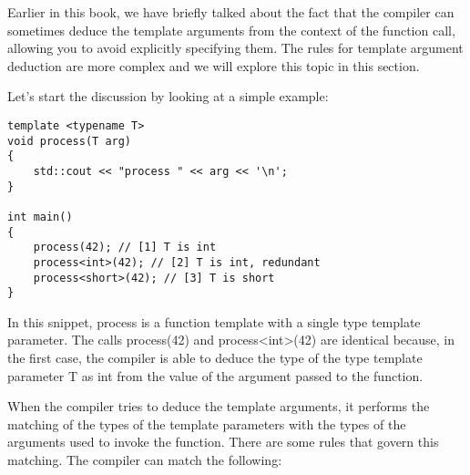 Earlier in this book, we have briefly talked about the fact that the compiler can sometimes deduce the template arguments from the context of the function call, allowing you to avoid explicitly specifying them. The rules for template argument deduction are more complex and we will explore this topic in this section.

Let’s start the discussion by looking at a simple example:

\begin{lstlisting}[style=styleCXX]
template <typename T>
void process(T arg)
{
	std::cout << "process " << arg << '\n';
}

int main()
{
	process(42); // [1] T is int
	process<int>(42); // [2] T is int, redundant
	process<short>(42); // [3] T is short
}
\end{lstlisting}

In this snippet, process is a function template with a single type template parameter. The calls process(42) and process<int>(42) are identical because, in the first case, the compiler is able to deduce the type of the type template parameter T as int from the value of the argument passed to the function.

When the compiler tries to deduce the template arguments, it performs the matching of the types of the template parameters with the types of the arguments used to invoke the function. There are some rules that govern this matching. The compiler can match the following:

